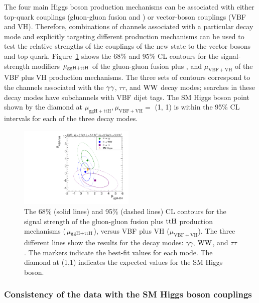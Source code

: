 \documentclass[11pt,twoside,a4paper,cmspaper,final,collab]{cms-tdr}
\begin{document}
The four main Higgs boson production mechanisms can be associated with either top-quark
couplings (gluon-gluon fusion and \cPqt\cPqt\PH) or vector-boson couplings (VBF and VH).
Therefore, combinations of channels associated with a particular decay mode
and explicitly targeting different production mechanisms
can be used to test the relative strengths of the couplings of the new state to the vector bosons and top quark.
Figure~\ref{fig:rvrf} shows the 68\% and 95\% CL contours for the signal-strength modifiers $\mu_{\mathrm{g}\mathrm{g}\mathrm{H}+\mathrm{t}\mathrm{t}\mathrm{H}}$  of
the gluon-gluon fusion plus \cPqt\cPqt\PH, and $\mu_{\mathrm{VBF+VH}}$ of the VBF plus VH production mechanisms.
The three sets of contours correspond to
the channels associated with the $\gamma\gamma$, $\tau\tau$, and $\mathrm{W}\mathrm{W}$
decay modes; searches in these decay modes have subchannels with VBF dijet tags.
The SM Higgs boson point shown by the diamond at $\mu_{\mathrm{ggH}+\mathrm{ttH}},\mu_{\mathrm{VBF+VH}}=$ (1, 1)
is within the 95\% CL intervals for each of the three decay modes.

\begin{figure}[bhtp]
\centering
\includegraphics[width=0.49\textwidth]{figures/comb/sqr_rvrf_scan_2d_all_68_legSM}
\caption{
The 68\% (solid lines) and 95\% (dashed lines) CL contours for the
signal strength of the gluon-gluon fusion plus $\mathrm{t}\mathrm{t}\mathrm{H}$  production mechanisms ($\mu_{\mathrm{g}\mathrm{g}\mathrm{H}+\mathrm{t}\mathrm{t}\mathrm{H}}$), versus
VBF plus VH ($\mu_{\mathrm{VBF+VH}}$).
 The three different lines show the results for the decay modes: $\gamma\gamma$, $\mathrm{W}\mathrm{W}$,
and $\tau\tau$. The markers indicate the best-fit values for each mode. The diamond
at (1,1) indicates the expected values for the SM Higgs boson.
}
\label{fig:rvrf}
\end{figure}




\subsubsection{Consistency of the data with the SM Higgs boson couplings}
\end{document}
